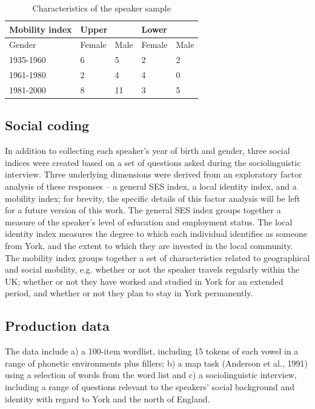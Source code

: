 \documentclass[PWPL]{article}
\begin{document}
\vspace*{6pt}
\begin{table}[ht]
\small
\centering
\begin{tabular}{l|l|l|l|l}
Mobility index&\multicolumn{2}{l|}{Upper}&\multicolumn{2}{l}{Lower}\\
\hline
Gender& Female& Male & Female & Male\\
\hline
1935-1960 & 6&5&2&2\\
 1961-1980& 2 &4&4&0\\
1981-2000&  8&11&3&5\\

\end{tabular}
\caption{Characteristics of the speaker sample}
\end{table}
\vspace*{6pt}

\subsection{Social coding}

In addition to collecting each speaker's year of birth and gender, three social indices were created based on a set of questions asked during the sociolinguistic interview. Three underlying dimensions were derived from an exploratory factor analysis of these responses -- a general SES index, a local identity index, and a mobility index; for brevity, the specific details of this factor analysis will be left for a future version of this work. The general SES index groups together a measure of the speaker's level of education and employment status. The local identity index measures the degree to which each individual identifies as someone from York, and the extent to which they are invested in the local community. The mobility index groups together a set of characteristics related to geographical and social mobility, e.g. whether or not the speaker travels regularly within the UK; whether or not they have worked and studied in York for an extended period, and whether or not they plan to stay in York permanently.

\subsection{Production data}

The data include a) a 100-item wordlist, including 15 tokens of each vowel in a range of phonetic environments plus fillers; b) a map task (Anderson et al., 1991) using a selection of words from the word list and c) a sociolinguistic interview, including a range of questions relevant to the speakers' social background and identity with regard to York and the north of England. 
\end{document}
